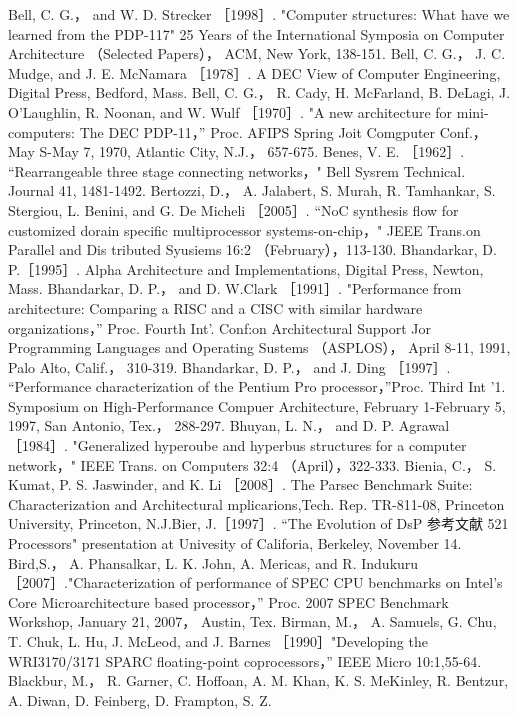 Bell, C. G.， and W. D. Strecker ［1998］. "Computer structures: What have we learned from the PDP-117" 25 Years of the
International Symposia on Computer Architecture （Selected Papers）， ACM, New York, 138-151.
Bell, C. G.， J. C. Mudge, and J. E. McNamara ［1978］. A DEC View of Computer Engineering, Digital Press, Bedford, Mass.
Bell, C. G.， R. Cady, H. McFarland, B. DeLagi, J. O'Laughlin, R. Noonan, and W. Wulf ［1970］. "A new architecture for
mini-computers: The DEC PDP-11，” Proc. AFIPS Spring Joit Comgputer Conf.， May S-May 7, 1970, Atlantic City, N.J.， 657-675.
Benes, V. E. ［1962］. “Rearrangeable three stage connecting networks，" Bell Sysrem Technical. Journal 41, 1481-1492.
Bertozzi, D.， A. Jalabert, S. Murah, R. Tamhankar, S. Stergiou, L. Benini, and G. De Micheli ［2005］. “NoC synthesis flow for
customized dorain specific multiprocessor systems-on-chip，" JEEE Trans.on Parallel and Dis tributed Syusiems 16:2
（February），113-130.
Bhandarkar, D. P.［1995］. Alpha Architecture and Implementations, Digital Press, Newton, Mass.
Bhandarkar, D. P.， and D. W.Clark ［1991］. "Performance from architecture: Comparing a RISC and a CISC with similar
hardware organizations，” Proc. Fourth Int'. Conf:on Architectural Support Jor Programming Languages and Operating
Sustems （ASPLOS）， April 8-11, 1991, Palo Alto, Calif.， 310-319.
Bhandarkar, D. P.， and J. Ding ［1997］. “Performance characterization of the Pentium Pro processor，”Proc. Third Int '1.
Symposium on High-Performance Compuer Architecture, February 1-February 5, 1997, San Antonio, Tex.， 288-297.
Bhuyan, L. N.， and D. P. Agrawal ［1984］. "Generalized hyperoube and hyperbus structures for a computer network，" IEEE Trans.
on Computers 32:4 （April），322-333.
Bienia, C.， S. Kumat, P. S. Jaswinder, and K. Li ［2008］. The Parsec Benchmark Suite: Characterization and Architectural
mplicarions,Tech. Rep. TR-811-08, Princeton University, Princeton, N.J.Bier, J.［1997］. “The Evolution of DsP
参考文献
521
Processors" presentation at Univesity of Califoria, Berkeley, November 14.
Bird,S.， A. Phansalkar, L. K. John, A. Mericas, and R. Indukuru ［2007］."Characterization of performance of SPEC CPU
benchmarks on Intel's Core Microarchitecture based processor，” Proc. 2007 SPEC Benchmark Workshop, January 21, 2007，
Austin, Tex.
Birman, M.， A. Samuels, G. Chu, T. Chuk, L. Hu, J. McLeod, and J. Barnes ［1990］"Developing the WRI3170/3171 SPARC
floating-point coprocessors，” IEEE Micro 10:1,55-64.
Blackbur, M.， R. Garner, C. Hoffoan, A. M. Khan, K. S. MeKinley, R. Bentzur, A. Diwan, D. Feinberg, D. Frampton, S. Z.
